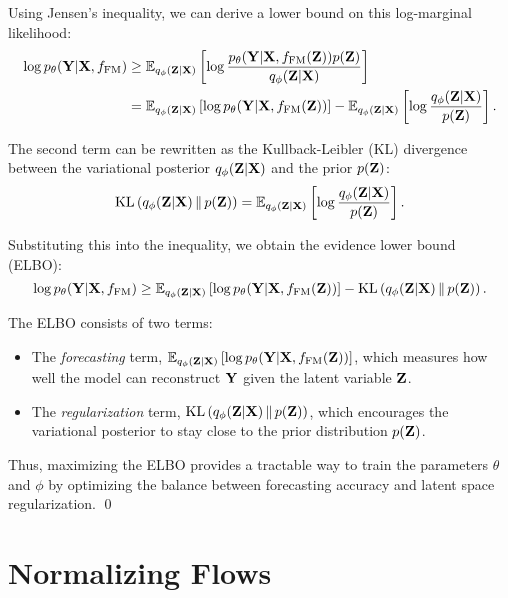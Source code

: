 Using Jensen's inequality, we can derive a lower bound on this log-marginal likelihood:
\begin{align}
\log p_\theta(\mathbf{Y}|\mathbf{X}, f_{\mathrm{FM}}) 
&\geq \mathbb{E}_{q_\phi(\mathbf{Z}|\mathbf{X})} \left[ \log \frac{p_\theta(\mathbf{Y}|\mathbf{X}, f_{\mathrm{FM}}(\mathbf{Z})) p(\mathbf{Z})}{q_\phi(\mathbf{Z}|\mathbf{X})} \right] \\
&= \mathbb{E}_{q_\phi(\mathbf{Z}|\mathbf{X})} \left[ \log p_\theta(\mathbf{Y}|\mathbf{X}, f_{\mathrm{FM}}(\mathbf{Z})) \right] 
    - \mathbb{E}_{q_\phi(\mathbf{Z}|\mathbf{X})} \left[ \log \frac{q_\phi(\mathbf{Z}|\mathbf{X})}{p(\mathbf{Z})} \right].
\end{align}

The second term can be rewritten as the Kullback-Leibler (KL) divergence between the variational posterior $q_\phi(\mathbf{Z}|\mathbf{X})$ and the prior $p(\mathbf{Z})$:
\begin{equation}
\mathrm{KL}\left(q_\phi(\mathbf{Z}|\mathbf{X}) \,\|\, p(\mathbf{Z})\right) = \mathbb{E}_{q_\phi(\mathbf{Z}|\mathbf{X})} \left[ \log \frac{q_\phi(\mathbf{Z}|\mathbf{X})}{p(\mathbf{Z})} \right].
\end{equation}

Substituting this into the inequality, we obtain the evidence lower bound (ELBO):
\begin{equation}
\log p_\theta(\mathbf{Y}|\mathbf{X}, f_{\mathrm{FM}}) \geq \mathbb{E}_{q_\phi(\mathbf{Z}|\mathbf{X})} \left[ \log p_\theta(\mathbf{Y}|\mathbf{X}, f_{\mathrm{FM}}(\mathbf{Z})) \right] 
    - \mathrm{KL}\left(q_\phi(\mathbf{Z}|\mathbf{X}) \,\|\, p(\mathbf{Z})\right).
\end{equation}

The ELBO consists of two terms:
\begin{itemize}
    \item The \emph{forecasting} term, $\mathbb{E}_{q_\phi(\mathbf{Z}|\mathbf{X})} \left[ \log p_\theta(\mathbf{Y}|\mathbf{X}, f_{\mathrm{FM}}(\mathbf{Z})) \right]$, which measures how well the model can reconstruct $\mathbf{Y}$ given the latent variable $\mathbf{Z}$.
    \item The \emph{regularization} term, $\mathrm{KL}\left(q_\phi(\mathbf{Z}|\mathbf{X}) \,\|\, p(\mathbf{Z})\right)$, which encourages the variational posterior to stay close to the prior distribution $p(\mathbf{Z})$.
\end{itemize}

Thus, maximizing the ELBO provides a tractable way to train the parameters $\theta$ and $\phi$ by optimizing the balance between forecasting accuracy and latent space regularization.
\qed

\section{Normalizing Flows}
\label{appendix:flows}

